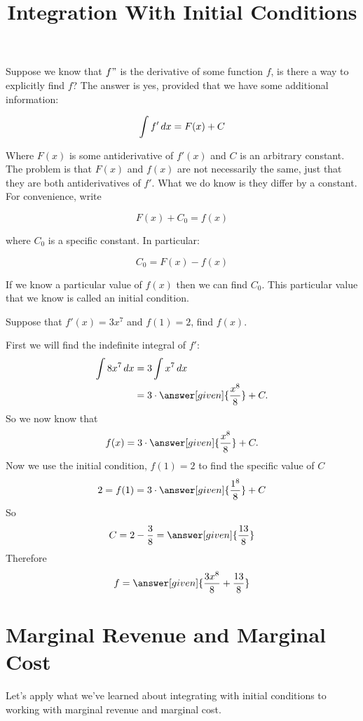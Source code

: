 \documentclass{ximera}
\title[Dig-In:]{Integration With Initial Conditions}
\begin{document}
\begin{abstract}
  
\end{abstract}
\maketitle

Suppose we know that $f"$ is the derivative of some function $f$, is there a way to explicitly find $f$? The 
answer is yes, provided that we have some additional information: 

$$\int f' \mathop{}\!d x = F(x)+C$$

Where $F(x)$ is some antiderivative of $f'(x)$ and $C$ is an arbitrary constant. The problem is that $F(x)$ and $f(x)$ are not
necessarily the same, just that they are both antiderivatives of $f'$. What we do know is they differ by a constant. For convenience, 
write

$$F(x)+C_{0}=f(x)$$ 

where $C_{0}$ is a specific constant. In particular:

$$C_{0} = F(x)-f(x)$$

If we know a particular value of $f(x)$ then we can find $C_{0}$. This particular value that we know is called an initial condition.

\begin{example}
Suppose that $f'(x)=3x^7$ and $f(1)= 2$, find $f(x)$.
\begin{explanation}
First we will find the indefinite integral of $f'$:
\begin{align*}
\int 8 x^7 \d x &= 3 \int x^7 \d x\\
&= 3 \cdot \answer[given]{\frac{x^8}{8}}+C.
\end{align*}
So we now know that 
$$f(x)=3 \cdot \answer[given]{\frac{x^8}{8}}+C.$$
Now we use the initial condition, $f(1)=2$ to find the specific value of $C$
$$2=f(1)=3 \cdot \answer[given]{\frac{1^8}{8}}+C$$
So
$$C=2-\frac{3}{8} = \answer[given]{\frac{13}{8}}$$
Therefore
$$f=\answer[given]{\frac{3x^{8}}{8}+\frac{13}{8}}$$
\end{explanation}
\end{example}

\section{Marginal Revenue and Marginal Cost}

Let's apply what we've learned about integrating with initial conditions to working with marginal revenue and marginal cost. 
\end{document}
